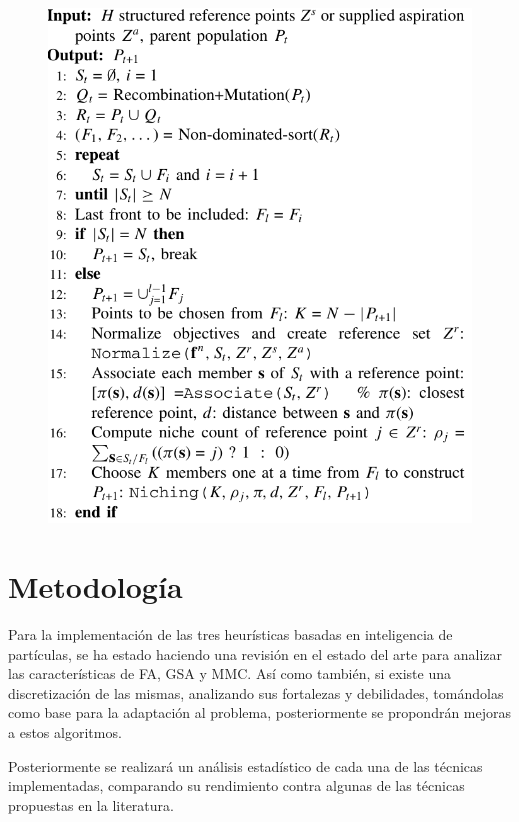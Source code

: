 \documentclass[letterpaper,10pt]{article}
\begin{document}
\begin{figure}[h]
 \centering
\includegraphics[scale=0.35]{nsgaiiiP.png}
\end{figure}

\section{Metodología}

Para la implementación de las tres heurísticas basadas en inteligencia de partículas, se ha estado haciendo una revisión en el estado del arte para analizar las características de FA, GSA y MMC.  Así como también, si existe una discretización  de las mismas, analizando sus fortalezas y debilidades, tomándolas  como  base para la adaptación al problema, posteriormente se propondrán mejoras a estos algoritmos.
 
Posteriormente se realizará un análisis estadístico de cada una de las técnicas implementadas, comparando su rendimiento contra algunas de las  técnicas propuestas en la literatura.
 
\end{document}
